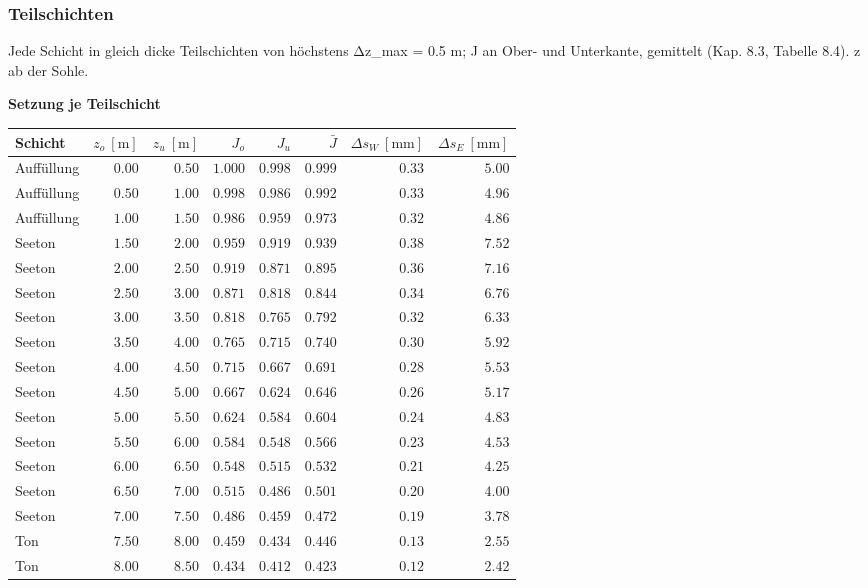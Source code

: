 \documentclass[11pt,a4paper]{article}
\begin{document}
\subsubsection{Teilschichten}
Jede Schicht in gleich dicke Teilschichten von höchstens Δz\_max = 0.5 m; J an Ober- und Unterkante, gemittelt (Kap. 8.3, Tabelle 8.4). z ab der Sohle.

\noindent\textbf{Setzung je Teilschicht}
\begin{longtable}{lrrrrrrr}
\hline
Schicht & $z_o\ [\mathrm{m}]$ & $z_u\ [\mathrm{m}]$ & $J_o$ & $J_u$ & $\bar{J}$ & $\Delta s_W\ [\mathrm{mm}]$ & $\Delta s_E\ [\mathrm{mm}]$ \\
\hline
\endhead
Auffüllung & $0.00$ & $0.50$ & $1.000$ & $0.998$ & $0.999$ & $0.33$ & $5.00$ \\
Auffüllung & $0.50$ & $1.00$ & $0.998$ & $0.986$ & $0.992$ & $0.33$ & $4.96$ \\
Auffüllung & $1.00$ & $1.50$ & $0.986$ & $0.959$ & $0.973$ & $0.32$ & $4.86$ \\
Seeton & $1.50$ & $2.00$ & $0.959$ & $0.919$ & $0.939$ & $0.38$ & $7.52$ \\
Seeton & $2.00$ & $2.50$ & $0.919$ & $0.871$ & $0.895$ & $0.36$ & $7.16$ \\
Seeton & $2.50$ & $3.00$ & $0.871$ & $0.818$ & $0.844$ & $0.34$ & $6.76$ \\
Seeton & $3.00$ & $3.50$ & $0.818$ & $0.765$ & $0.792$ & $0.32$ & $6.33$ \\
Seeton & $3.50$ & $4.00$ & $0.765$ & $0.715$ & $0.740$ & $0.30$ & $5.92$ \\
Seeton & $4.00$ & $4.50$ & $0.715$ & $0.667$ & $0.691$ & $0.28$ & $5.53$ \\
Seeton & $4.50$ & $5.00$ & $0.667$ & $0.624$ & $0.646$ & $0.26$ & $5.17$ \\
Seeton & $5.00$ & $5.50$ & $0.624$ & $0.584$ & $0.604$ & $0.24$ & $4.83$ \\
Seeton & $5.50$ & $6.00$ & $0.584$ & $0.548$ & $0.566$ & $0.23$ & $4.53$ \\
Seeton & $6.00$ & $6.50$ & $0.548$ & $0.515$ & $0.532$ & $0.21$ & $4.25$ \\
Seeton & $6.50$ & $7.00$ & $0.515$ & $0.486$ & $0.501$ & $0.20$ & $4.00$ \\
Seeton & $7.00$ & $7.50$ & $0.486$ & $0.459$ & $0.472$ & $0.19$ & $3.78$ \\
Ton & $7.50$ & $8.00$ & $0.459$ & $0.434$ & $0.446$ & $0.13$ & $2.55$ \\
Ton & $8.00$ & $8.50$ & $0.434$ & $0.412$ & $0.423$ & $0.12$ & $2.42$ \\

\end{longtable}
\end{document}
